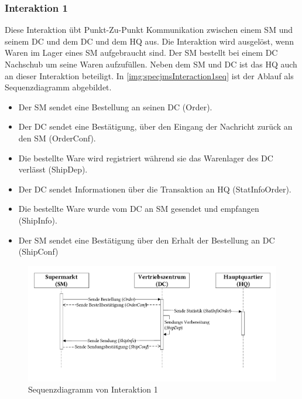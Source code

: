\subsubsection{Interaktion 1}
Diese Interaktion übt Punkt-Zu-Punkt Kommunikation zwischen einem SM und seinem DC und dem DC und dem HQ aus. Die Interaktion wird ausgelöst, wenn Waren im Lager eines SM aufgebraucht sind. Der SM bestellt bei einem DC Nachschub um seine Waren aufzufüllen. Neben dem SM und DC ist das HQ auch an dieser Interaktion beteiligt. In \autoref{img:specjmsInteraction1seq} ist der Ablauf als Sequenzdiagramm abgebildet. 
\begin{itemize}
    \item Der SM sendet eine Bestellung an seinen DC (Order).
    \item Der DC sendet eine Bestätigung, über den Eingang der Nachricht zurück an den SM (OrderConf).
    \item Die bestellte Ware wird registriert während sie das Warenlager des DC verlässt (ShipDep).
    \item Der DC sendet Informationen über die Transaktion an HQ (StatInfoOrder).
    \item Die bestellte Ware wurde vom DC an SM gesendet und empfangen (ShipInfo).
    \item Der SM sendet eine Bestätigung über den Erhalt der Bestellung an DC (ShipConf)
\end{itemize}

\begin{figure}
\center
  \includegraphics[width=1\textwidth]{images/evaluation/specjms/evaluationInteraktion1seq.pdf}
  \caption{Sequenzdiagramm von Interaktion 1}
  \label{img:specjmsInteraction1seq}
\end{figure}


